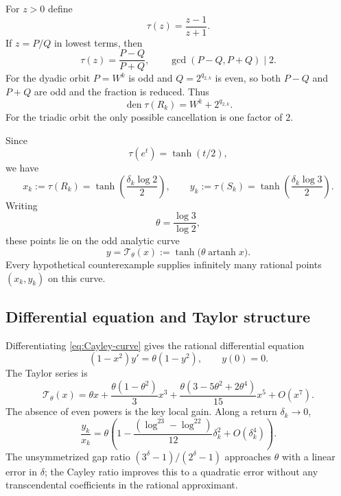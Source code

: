 \documentclass[11pt]{article}
\theoremstyle{definition}
\theoremstyle{remark}
\newcommand{\den}{\operatorname{den}}
\begin{document}
For $z>0$ define
\begin{equation}\label{eq:Cayley}
 \tau(z)=\frac{z-1}{z+1}.
\end{equation}
If $z=P/Q$ in lowest terms, then
\begin{equation}\label{eq:Cayley-PQ}
 \tau(z)=\frac{P-Q}{P+Q},
 \qquad
 \gcd(P-Q,P+Q)\mid2.
\end{equation}
For the dyadic orbit $P=W^k$ is odd and $Q=2^{q_{2,k}}$ is even, so both $P-Q$ and $P+Q$ are odd and the fraction is reduced.  Thus
\begin{equation}\label{eq:Cayley-den2}
 \den\tau(R_k)=W^k+2^{q_{2,k}}.
\end{equation}
For the triadic orbit the only possible cancellation is one factor of $2$.

Since
\[
 \tau(e^t)=\tanh(t/2),
\]
we have
\begin{equation}\label{eq:taupk}
 x_k:=\tau(R_k)=\tanh\!\left(\frac{\delta_k\log2}{2}\right),
 \qquad
 y_k:=\tau(S_k)=\tanh\!\left(\frac{\delta_k\log3}{2}\right).
\end{equation}
Writing
\begin{equation}\label{eq:theta}
 \theta=\frac{\log3}{\log2},
\end{equation}
these points lie on the odd analytic curve
\begin{equation}\label{eq:Cayley-curve}
 y=\mathcal T_\theta(x)
 :=\tanh\!\bigl(\theta\operatorname{artanh}x\bigr).
\end{equation}
Every hypothetical counterexample supplies infinitely many rational points $(x_k,y_k)$ on this curve.

\subsection{Differential equation and Taylor structure}

Differentiating \eqref{eq:Cayley-curve} gives the rational differential equation
\begin{equation}\label{eq:Cayley-ODE}
 (1-x^2)y'=\theta(1-y^2),
 \qquad y(0)=0.
\end{equation}
The Taylor series is
\begin{equation}\label{eq:Cayley-series}
 \mathcal T_\theta(x)
 =\theta x
 +\frac{\theta(1-\theta^2)}3x^3
 +\frac{\theta(3-5\theta^2+2\theta^4)}{15}x^5
 +O(x^7).
\end{equation}
The absence of even powers is the key local gain.  Along a return $\delta_k\to0$,
\begin{equation}\label{eq:Cayley-ratio-exp}
 \frac{y_k}{x_k}
 =\theta\left(
 1-\frac{(\log^23-\log^22)}{12}\delta_k^2
 +O(\delta_k^4)
 \right).
\end{equation}
The unsymmetrized gap ratio $(3^{\delta}-1)/(2^{\delta}-1)$ approaches $\theta$ with a linear error in $\delta$; the Cayley ratio improves this to a quadratic error without any transcendental coefficients in the rational approximant.
\end{document}
